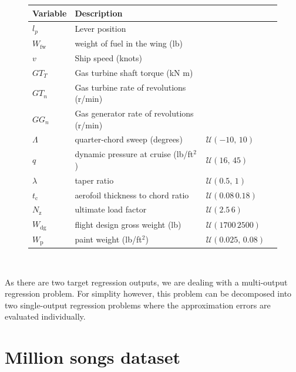 \documentclass[
  a4paper,  %
  twoside,  %
  bibliography=totoc,
  headsepline,
  cleardoublepage=empty,
  parskip=half,
  draft=false
]{scrbook}
\begin{document}
\begin{mdframed}[style=style]
\begin{figure}[H]
\vspace{-2mm}
\centering
\bgroup
\def\arraystretch{1.2}%
  \begin{tabular}{ l l l l}
Variable & Description\\
\hline
$l_p$ & Lever position & \\
$W_{\mathrm{fw}}$ & weight of fuel in the wing (lb)\\
$v$ & Ship speed (knots)\\
$GT_T$ & Gas turbine shaft torque (kN m)\\
$GT_n$ & Gas turbine rate of revolutions (r/min)\\
$GG_n$ & Gas generator rate of revolutions (r/min)\\
$\Lambda$ & quarter-chord sweep (degrees) & $\mathcal{U}(-10 ,\,  10)$\\
$q$ & dynamic pressure at cruise (lb/ft$^2$) & $\mathcal{U}(16,\, 45)$\\
$\lambda$ & taper ratio & $\mathcal{U}(0.5, \, 1)$\\
$t_\mathrm{c}$ & aerofoil thickness to chord ratio & $\mathcal{U}(0.08\, 0.18)$\\
$N_\mathrm{z}$ & ultimate load factor & $\mathcal{U}(2.5\, 6)$\\
$W_\mathrm{dg}$ & flight design gross weight (lb)& $\mathcal{U}(1700\, 2500)$\\
$W_\mathrm{p}$ & paint weight (lb/ft$^2$) & $\mathcal{U}(0.025,\, 0.08)$\\
\end{tabular}
\egroup\\
\vspace{0.5em}
\delimit
{}
\label{tab:ww_params}
\end{figure}
\end{mdframed}

As there are two target regression outputs, we are dealing with a multi-output regression problem.
For simplity however, this problem can be decomposed into two single-output regression problems where the approximation errors are evaluated individually.

\section{Million songs dataset}
\end{document}
